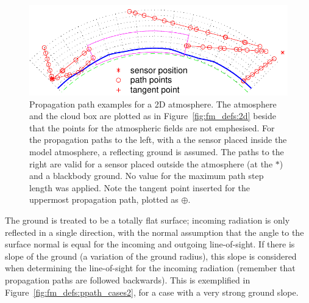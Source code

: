  \begin{figure}[!t]
  \begin{center}
   \includegraphics*[width=0.95\hsize]{Figs/fm_definitions/ppath_cases1}
   \caption{Propagation path examples for a 2D atmosphere. The atmosphere 
     and the cloud box are plotted as in Figure~\ref{fig:fm_defs:2d}
     beside that the points for the atmospheric fields are not
     emphesised. For the propagation paths to the left, with a the
     sensor placed inside the model atmosphere, a reflecting ground is
     assumed. The paths to the right are valid for a sensor placed
     outside the atmosphere (at the $*$) and a blackbody ground. No
     value for the maximum path step length was applied. Note the tangent
     point inserted for the uppermost propagation path, plotted as $\oplus$.}
   \label{fig:fm_defs:ppath_cases1}
  \end{center}
 \end{figure}


\label{sec:fm_defs:solverte}


\label{sec:fm_defs:groundrefl}

The ground is treated to be a totally flat surface; incoming radiation
is only reflected in a single direction, with the normal assumption
that the angle to the surface normal is equal for the incoming and
outgoing line-of-sight. If there is slope of the ground (a variation
of the ground radius), this slope is considered when determining the
line-of-sight for the incoming radiation (remember that propagation
paths are followed backwards). This is exemplified in
Figure~\ref{fig:fm_defs:ppath_cases2}, for a case with a very strong
ground slope.

